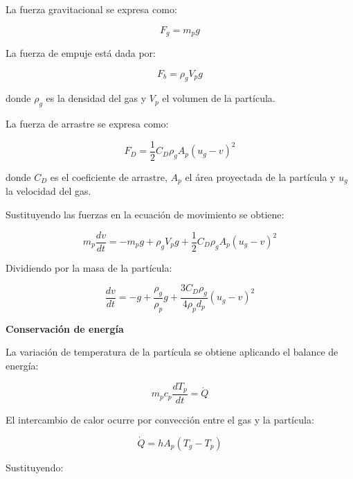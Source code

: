 \documentclass[11pt,stdletter,orderfromtodate,sigleft,twoside]{report}
\begin{document}
La fuerza gravitacional se expresa como:

\begin{equation}
    F_g = m_p g
    \label{eq:F_g}
\end{equation}

La fuerza de empuje está dada por:

\begin{equation}
    F_b = \rho_g V_p g
    \label{eq:F_bs}
\end{equation}

donde $\rho_g$ es la densidad del gas y $V_p$ el volumen de la partícula.

La fuerza de arrastre se expresa como:

\begin{equation}  
    F_D = \frac{1}{2} C_D \rho_g A_p (u_g - v)^2
    \label{eq:05}
\end{equation}

donde $C_D$ es el coeficiente de arrastre, $A_p$ el área proyectada de la partícula y $u_g$ la velocidad del gas.

Sustituyendo las fuerzas en la ecuación de movimiento se obtiene:

\begin{equation}  
    m_p \frac{dv}{dt} =
- m_p g
+ \rho_g V_p g
+ \frac{1}{2} C_D \rho_g A_p (u_g - v)^2
    \label{eq:06}
\end{equation}

Dividiendo por la masa de la partícula:

\begin{equation}  
    \frac{dv}{dt} =
- g
+ \frac{\rho_g}{\rho_p} g
+ \frac{3 C_D \rho_g}{4 \rho_p d_p}(u_g - v)^2
    \label{eq:07}
\end{equation}

\textbf{Conservación de energía} 

La variación de temperatura de la partícula se obtiene aplicando el balance de energía:

\begin{equation}  
    m_p c_p \frac{dT_p}{dt} = \dot{Q}
    \label{eq:08}
\end{equation}

El intercambio de calor ocurre por convección entre el gas y la partícula:

\begin{equation}  
    \dot{Q} = h A_p (T_g - T_p)
    \label{eq:09}
\end{equation}

Sustituyendo:
\end{document}
